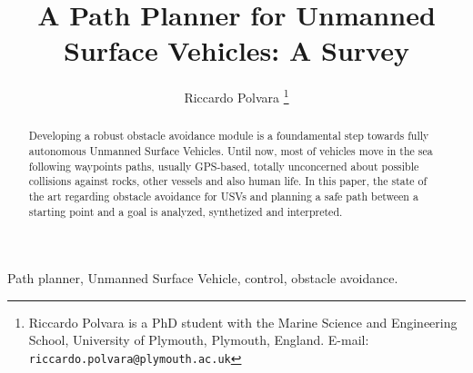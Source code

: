 \documentclass[journal]{IEEEtran}
\begin{document}
%
\title{A Path Planner for Unmanned Surface Vehicles: A Survey}
%
%
%

\author{Riccardo Polvara%
\thanks{Riccardo Polvara is a PhD student with the Marine Science and Engineering School, University of Plymouth, Plymouth, England.
      E-mail: {\tt riccardo.polvara@plymouth.ac.uk}}}




\maketitle


\begin{abstract}
Developing a robust obstacle avoidance module is a foundamental step towards fully autonomous Unmanned Surface Vehicles. Until now, most of vehicles move in the sea following way\-points paths, usually GPS-based, totally unconcerned about possible collisions against rocks, other vessels and also human life. In this paper, the state of the art regarding obstacle avoidance for USVs and planning a safe path between a starting point and a goal is analyzed, synthetized and interpreted.
\end{abstract}


\begin{IEEEkeywords}
Path planner, Unmanned Surface Vehicle, control, obstacle avoidance.
\end{IEEEkeywords}



%
\end{document}
